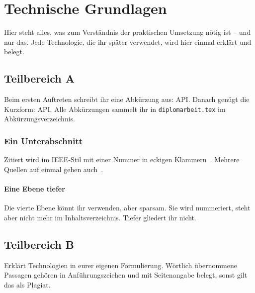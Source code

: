 \chapter{Technische Grundlagen}

Hier steht alles, was zum Verständnis der praktischen Umsetzung nötig ist --
und nur das. Jede Technologie, die ihr später verwendet, wird hier einmal
erklärt und belegt.

\section{Teilbereich A}

Beim ersten Auftreten schreibt ihr eine Abkürzung aus: \ac{API}. Danach
genügt die Kurzform: \ac{API}. Alle Abkürzungen sammelt ihr in
\texttt{diplomarbeit.tex} im Abkürzungsverzeichnis.

\subsection{Ein Unterabschnitt}

Zitiert wird im IEEE-Stil mit einer Nummer in eckigen
Klammern~\cite{beispiel-artikel}. Mehrere Quellen auf einmal gehen
auch~\cite{beispiel-buch,beispiel-online}.

\subsubsection{Eine Ebene tiefer}

Die vierte Ebene könnt ihr verwenden, aber sparsam. Sie wird nummeriert,
steht aber nicht mehr im Inhaltsverzeichnis. Tiefer gliedert ihr nicht.

\section{Teilbereich B}

Erklärt Technologien in eurer eigenen Formulierung. Wörtlich übernommene
Passagen gehören in Anführungszeichen und mit Seitenangabe belegt, sonst gilt
das als Plagiat.





